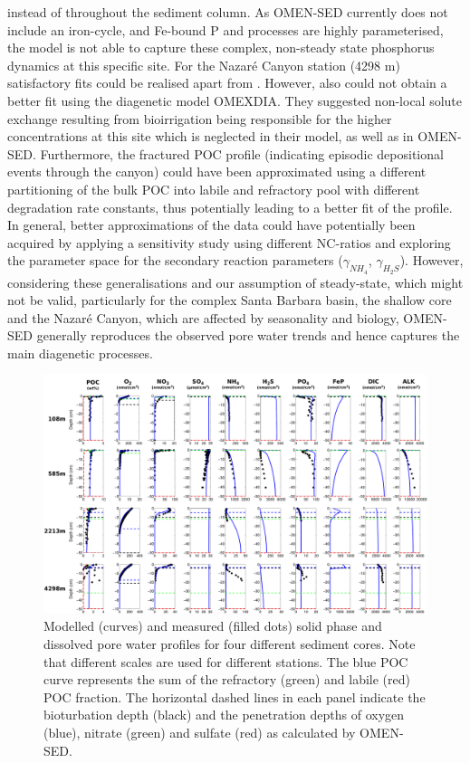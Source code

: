 \documentclass[gmd, manuscript]{copernicus}
\begin{document}
instead of throughout the sediment column. %
As OMEN-SED currently does not include an iron-cycle, and Fe-bound P and  processes are highly parameterised, the model is not able to capture these complex, non-steady state phosphorus 
dynamics at this specific site. 
For the Nazar\'e Canyon station (4298 m) satisfactory fits could be realised apart from . However, also \citet{epping_oxidation_2002} could not obtain a better fit 
using the diagenetic model OMEXDIA. They suggested non-local solute exchange resulting from bioirrigation being responsible for the higher  concentrations at this site which is neglected in their model, as well as in 
OMEN-SED. Furthermore, the fractured POC profile (indicating episodic depositional events through the canyon) could have been approximated using a different partitioning of the bulk POC into 
labile and refractory pool with different degradation rate constants, thus potentially leading to a better fit of the  profile.  
In general, better approximations of the data could have potentially been acquired by applying a sensitivity study using different NC-ratios \citep[e.g.][report different ratios from Redfield stoichiometry]{epping_oxidation_2002} 
and exploring the parameter space for the secondary reaction parameters ($\gamma_{NH_4}$, $\gamma_{H_2S}$). 
However, considering these generalisations and our assumption of steady-state, which might not be valid, particularly for the complex Santa Barbara basin, the shallow core and the Nazar\'e Canyon, which are affected by seasonality 
and biology, OMEN-SED generally reproduces the observed pore water trends and hence captures the main diagenetic processes. 

\begin{figure}
	\includegraphics[width=1.0\textwidth]{figures/Profiles/0_ALL_PROFILES_COMBINED_1804.pdf}
	\caption{Modelled (curves) and measured (filled dots) solid phase and dissolved pore water profiles for four different sediment cores. Note that different 
	scales are used for different stations. The blue POC curve represents the sum of the refractory (green) and labile (red) POC fraction. The horizontal dashed lines in each panel indicate the 
	bioturbation depth (black) and the penetration depths of oxygen (blue), nitrate (green) and sulfate (red) as calculated by OMEN-SED.}
	\label{fig:Sediment_profiles}
\end{figure}
\end{document}
